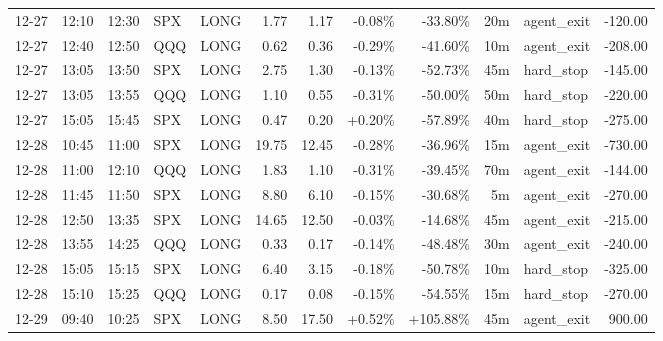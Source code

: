 \documentclass[11pt,a4paper,twoside]{article}
\begin{document}
\begin{center}
\begin{longtable}{>{\color{txtmain}}l l l l l r r r r r >{\color{txtmain}}l r}
12-27 & 12:10 & 12:30 & SPX & LONG & 1.77 & 1.17 & \textcolor{lossred}{-0.08\%} & \textcolor{lossred}{-33.80\%} & 20m & agent\_exit & \textcolor{lossred}{-120.00} \\
12-27 & 12:40 & 12:50 & QQQ & LONG & 0.62 & 0.36 & \textcolor{lossred}{-0.29\%} & \textcolor{lossred}{-41.60\%} & 10m & agent\_exit & \textcolor{lossred}{-208.00} \\
12-27 & 13:05 & 13:50 & SPX & LONG & 2.75 & 1.30 & \textcolor{lossred}{-0.13\%} & \textcolor{lossred}{-52.73\%} & 45m & hard\_stop & \textcolor{lossred}{-145.00} \\
12-27 & 13:05 & 13:55 & QQQ & LONG & 1.10 & 0.55 & \textcolor{lossred}{-0.31\%} & \textcolor{lossred}{-50.00\%} & 50m & hard\_stop & \textcolor{lossred}{-220.00} \\
12-27 & 15:05 & 15:45 & SPX & LONG & 0.47 & 0.20 & \textcolor{wingreen}{+0.20\%} & \textcolor{lossred}{-57.89\%} & 40m & hard\_stop & \textcolor{lossred}{-275.00} \\
12-28 & 10:45 & 11:00 & SPX & LONG & 19.75 & 12.45 & \textcolor{lossred}{-0.28\%} & \textcolor{lossred}{-36.96\%} & 15m & agent\_exit & \textcolor{lossred}{-730.00} \\
12-28 & 11:00 & 12:10 & QQQ & LONG & 1.83 & 1.10 & \textcolor{lossred}{-0.31\%} & \textcolor{lossred}{-39.45\%} & 70m & agent\_exit & \textcolor{lossred}{-144.00} \\
12-28 & 11:45 & 11:50 & SPX & LONG & 8.80 & 6.10 & \textcolor{lossred}{-0.15\%} & \textcolor{lossred}{-30.68\%} & 5m & agent\_exit & \textcolor{lossred}{-270.00} \\
12-28 & 12:50 & 13:35 & SPX & LONG & 14.65 & 12.50 & \textcolor{lossred}{-0.03\%} & \textcolor{lossred}{-14.68\%} & 45m & agent\_exit & \textcolor{lossred}{-215.00} \\
12-28 & 13:55 & 14:25 & QQQ & LONG & 0.33 & 0.17 & \textcolor{lossred}{-0.14\%} & \textcolor{lossred}{-48.48\%} & 30m & agent\_exit & \textcolor{lossred}{-240.00} \\
12-28 & 15:05 & 15:15 & SPX & LONG & 6.40 & 3.15 & \textcolor{lossred}{-0.18\%} & \textcolor{lossred}{-50.78\%} & 10m & hard\_stop & \textcolor{lossred}{-325.00} \\
12-28 & 15:10 & 15:25 & QQQ & LONG & 0.17 & 0.08 & \textcolor{lossred}{-0.15\%} & \textcolor{lossred}{-54.55\%} & 15m & hard\_stop & \textcolor{lossred}{-270.00} \\
12-29 & 09:40 & 10:25 & SPX & LONG & 8.50 & 17.50 & \textcolor{wingreen}{+0.52\%} & \textcolor{wingreen}{+105.88\%} & 45m & agent\_exit & \textcolor{wingreen}{900.00} \\

\end{longtable}
\end{center}
\end{document}
